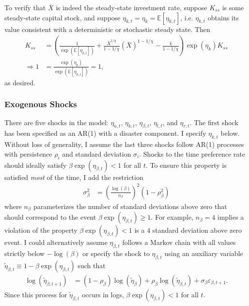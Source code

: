\documentclass[12 pt, oneside]{article}
\theoremstyle{definition}
\theoremstyle{definition}
\theoremstyle{definition}
\newcommand{\E}{\mathbb{E}}
\newcommand{\RA}{\Rightarrow}
\begin{document}
To verify that $\overline{X}$ is indeed the steady-state investment rate, suppose $K_{ss}$ is some steady-state capital stock, and suppose $\eta_{k, t} = \eta_k = \E[\eta_{k, t}]$, i.e. $\eta_{k, t}$ obtains its value consistent with a deterministic or stochastic steady state. Then
\begin{align*}
  K_{ss} & = \left(\frac{1}{\exp(\E[\eta_{k, t}])} + \frac{\overline{X}^{1 / \chi}}{1 - 1 / \chi}\left(\overline{X}\right)^{1 - 1 / \chi} - \frac{\overline{\chi}}{1 - 1 / \chi}\right)\exp(\eta_k)K_{ss}\\
  \RA 1 & = \frac{\exp(\eta_k)}{\exp(\E[\eta_{k, t}])} = 1,
\end{align*}
as desired.


\subsubsection{Exogenous Shocks}\label{sec:exog shocks}
There are five shocks in the model: $\eta_{a, t}$, $\eta_{k, t}$, $\eta_{\beta, t}$, $\eta_{l, t}$, and $\eta_{r, t}$. The first shock has been specified as an AR(1) with a disaster component. I specify $\eta_{k, t}$ below. Without loss of generality, I assume the last three shocks follow AR(1) processes with persistence $\rho_i$ and standard deviation $\sigma_i$. Shocks to the time preference rate should ideally satisfy $\beta \exp(\eta_{\beta, t}) < 1$ for all $t$. To ensure this property is satisfied \emph{most} of the time, I add the restriction
\begin{align}
  \sigma_\beta^2 & = \left(\frac{\log(\beta)}{n_\beta}\right)^2(1 - \rho_\beta^2)
\end{align}
where $n_\beta$ parameterizes the number of standard deviations above zero that should correspond to the event $\beta\exp(\eta_{\beta, t}) \geq 1$. For example, $n_\beta = 4$ implies a violation of the property $\beta\exp(\eta_{\beta, t}) < 1$ is a 4 standard deviation above zero event.
I could alternatively assume $\eta_{\beta, t}$ follows a Markov chain with all values strictly below $-\log(\beta)$ or specify the shock to $\eta_{\beta, t}$ using an auxiliary variable $\tilde{\eta}_{\beta, t} \equiv 1 - \beta \exp(\eta_{\beta, t})$ such that
\begin{align}
  \log(\tilde{\eta}_{\beta, t + 1}) & = (1 - \rho_\beta)\log(\tilde{\eta}_\beta) + \rho_\beta \log(\tilde{\eta}_{\beta, t}) + \sigma_\beta \varepsilon_{\beta, t + 1}.
\end{align}
Since this process for $\tilde{\eta}_{\beta, t}$ occurs in logs, $\beta \exp(\eta_{\beta, t}) < 1$ for all $t$.
\end{document}
